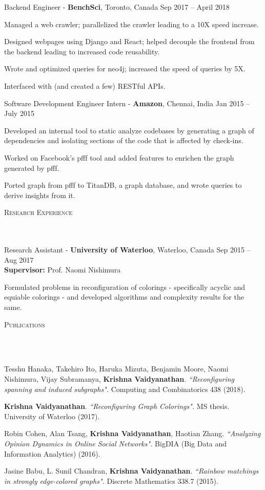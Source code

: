\documentclass{article}
\newcommand{\header}[1]{{
\hspace*{-15pt}\vspace*{6pt} \textsc{#1}} \vspace*{-6pt} 
\lineunder
}
\newcommand{\lineunder}{
\vspace*{-8pt} \\ \hspace*{-18pt} 
\hrulefill \\
}
\newcommand{\employer}[4]{{
\vspace*{2pt}%
#1 - \textbf{#2}, #3 \hfill #4 \vspace*{2pt}}
}
\renewcommand{\labelitemii}{
$\vcenter{\hbox{\tiny$\bullet$}}$\hspace*{-3pt}
}
\newenvironment{bullet-list-major}{
\begin{list}{\labelitemii}{\setlength\leftmargin{3pt} 
\topsep 0pt \itemsep -2pt}}{\vspace*{4pt}\end{list}
}
\newenvironment{bullet-list-minor}{
\begin{list}{\labelitemii}{\setlength\leftmargin{15pt} 
\topsep 0pt \itemsep -2pt}}{\vspace*{4pt}\end{list}
}
\begin{document}
    \employer{Backend Engineer}{BenchSci}{Toronto, Canada}{Sep 2017 -- April 2018}{}
	\begin{bullet-list-minor}
	\item Managed a web crawler; parallelized the crawler leading to a 10X speed
increase.
	\item Designed webpages using Django and React; helped decouple the frontend
from the backend leading to increased code reusability.
	\item Wrote and optimized queries for neo4j; increased the speed of
queries by 5X.
	\item Interfaced with (and created a few) RESTful APIs.
    \end{bullet-list-minor}

    \employer{Software Development Engineer Intern}{Amazon}{Chennai, India}{Jan 2015 -- July 2015}{}
	\begin{bullet-list-minor}
        \item Developed an internal tool to static analyze codebases by
            generating a graph of dependencies and isolating sections of the
            code that is affected by check-ins.
        \item Worked on Facebook's pfff tool and added features to enrichen the
            graph generated by pfff.
        \item Ported graph from pfff to TitanDB, a graph database, and wrote
            queries to derive insights from it.
    \end{bullet-list-minor}

\vspace*{4pt}%
\header{Research Experience}
\employer{Research Assistant}{University of Waterloo}{Waterloo, Canada}
{Sep 2015 -- Aug 2017}{\\\textbf{Supervisor:} Prof. Naomi Nishimura}
\begin{bullet-list-minor}
\item Formulated problems in reconfiguration of colorings - specifically acyclic
and equiable colorings - and developed algorithms and complexity results for the
same.
\end{bullet-list-minor}

\vspace*{4pt}%
\header{Publications}
\begin{bullet-list-major}
\item Tesshu Hanaka, Takehiro Ito, Haruka Mizuta, Benjamin Moore, Naomi
Nishimura, Vijay Subramanya, \textbf{Krishna Vaidyanathan}. \textit{``Reconfiguring
spanning and induced subgraphs".} Computing and Combinatorics 438 (2018).
\item \textbf{Krishna Vaidyanathan}. \textit{``Reconfiguring Graph Colorings".} MS thesis. University of Waterloo (2017).
\item Robin Cohen, Alan Tsang, \textbf{Krishna Vaidyanathan}, Haotian Zhang. \textit{``Analyzing Opinion Dynamics in Online Social Networks".} BigDIA (Big Data and Information Analytics) (2016).
\item Jasine  Babu,  L.  Sunil  Chandran, \textbf{Krishna  Vaidyanathan}.
\textit{``Rainbow matchings in strongly edge-colored graphs".} Discrete Mathematics 338.7 (2015).
\end{bullet-list-major}
\end{document}
